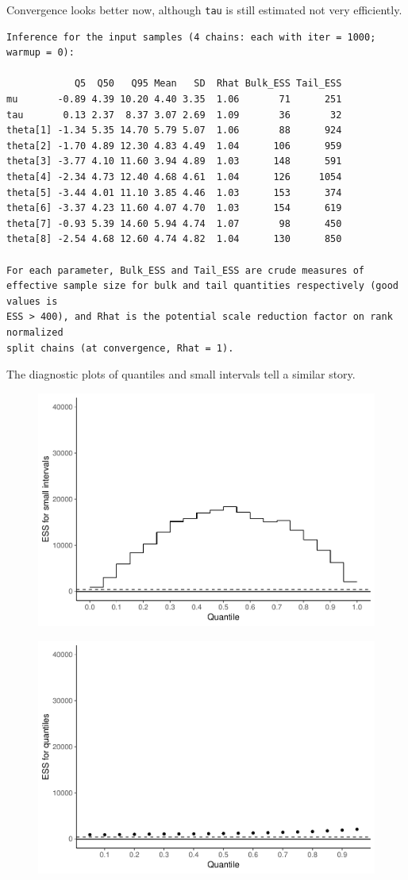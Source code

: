 \documentclass[american,]{article}
\begin{document}
Convergence looks better now, although \texttt{tau} is still estimated
not very efficiently.

\begin{verbatim}
Inference for the input samples (4 chains: each with iter = 1000; warmup = 0):

            Q5  Q50   Q95 Mean   SD  Rhat Bulk_ESS Tail_ESS
mu       -0.89 4.39 10.20 4.40 3.35  1.06       71      251
tau       0.13 2.37  8.37 3.07 2.69  1.09       36       32
theta[1] -1.34 5.35 14.70 5.79 5.07  1.06       88      924
theta[2] -1.70 4.89 12.30 4.83 4.49  1.04      106      959
theta[3] -3.77 4.10 11.60 3.94 4.89  1.03      148      591
theta[4] -2.34 4.73 12.40 4.68 4.61  1.04      126     1054
theta[5] -3.44 4.01 11.10 3.85 4.46  1.03      153      374
theta[6] -3.37 4.23 11.60 4.07 4.70  1.03      154      619
theta[7] -0.93 5.39 14.60 5.94 4.74  1.07       98      450
theta[8] -2.54 4.68 12.60 4.74 4.82  1.04      130      850

For each parameter, Bulk_ESS and Tail_ESS are crude measures of 
effective sample size for bulk and tail quantities respectively (good values is 
ESS > 400), and Rhat is the potential scale reduction factor on rank normalized
split chains (at convergence, Rhat = 1).
\end{verbatim}

The diagnostic plots of quantiles and small intervals tell a similar
story.

\begin{figure}[tp]
  \centering
  \includegraphics[width=0.6\linewidth]{graphics/local-ess-jags-cp-tau-longer-1.pdf}
\end{figure}

\begin{figure}[tp]
  \centering
  \includegraphics[width=0.6\linewidth]{graphics/quantile-ess-jags-cp-tau-longer-1.pdf}
\end{figure}
\end{document}
